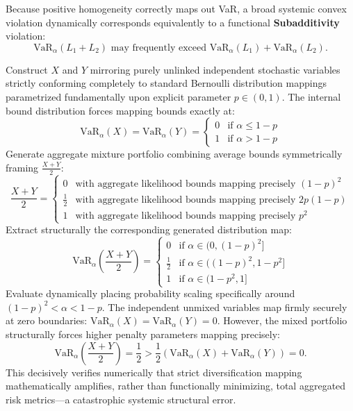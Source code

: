 Because positive homogeneity correctly maps out VaR, a broad systemic convex violation dynamically corresponds equivalently to a functional \textbf{Subadditivity} violation:
$$
\text{VaR}_\alpha(L_1 + L_2) \text{ may frequently exceed } \text{VaR}_\alpha(L_1) + \text{VaR}_\alpha(L_2).
$$

\begin{example}
Construct $X$ and $Y$ mirroring purely unlinked independent stochastic variables strictly conforming completely to standard Bernoulli distribution mappings parametrized fundamentally upon explicit parameter $p \in (0, 1)$. The internal bound distribution forces mapping bounds exactly at:
$$
\text{VaR}_\alpha(X) = \text{VaR}_\alpha(Y) = 
\begin{cases} 
0 & \text{if } \alpha \leq 1 - p \\ 
1 & \text{if } \alpha > 1 - p 
\end{cases}
$$
Generate aggregate mixture portfolio combining average bounds symmetrically framing $\frac{X + Y}{2}$:
$$
\frac{X + Y}{2} = 
\begin{cases} 
0 & \text{with aggregate likelihood bounds mapping precisely } (1 - p)^2 \\ 
\frac{1}{2} & \text{with aggregate likelihood bounds mapping precisely } 2p(1 - p) \\ 
1 & \text{with aggregate likelihood bounds mapping precisely } p^2 
\end{cases}
$$
Extract structurally the corresponding generated distribution map:
$$
\text{VaR}_\alpha\left(\frac{X + Y}{2}\right) = 
\begin{cases} 
0 & \text{if } \alpha \in (0, (1 - p)^2] \\ 
\frac{1}{2} & \text{if } \alpha \in ((1 - p)^2, 1 - p^2] \\ 
1 & \text{if } \alpha \in (1 - p^2, 1] 
\end{cases}
$$
Evaluate dynamically placing probability scaling specifically around $(1 - p)^2 < \alpha < 1 - p$. The independent unmixed variables map firmly securely at zero boundaries: $\text{VaR}_\alpha(X) = \text{VaR}_\alpha(Y) = 0$. However, the mixed portfolio structurally forces higher penalty parameters mapping precisely:
$$
\text{VaR}_\alpha\left(\frac{X + Y}{2}\right) = \frac{1}{2} > \frac{1}{2}(\text{VaR}_\alpha(X) + \text{VaR}_\alpha(Y)) = 0.
$$
This decisively verifies numerically that strict diversification mapping mathematically amplifies, rather than functionally minimizing, total aggregated risk metrics—a catastrophic systemic structural error.
\end{example}

